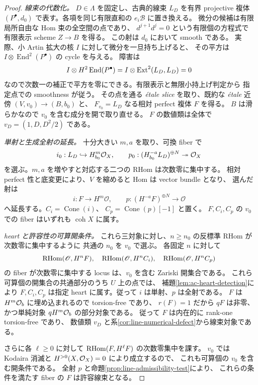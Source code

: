 \begin{proof}
\emph{線束の代数化。}
$D\in\Lambda$ を固定し、古典的線束 $L_D$ を有界 projective 複体
$(P^\bullet,d_0)$ で表す。各項を同じ有限直和の $e_i\mathscr B$ に置き換える。
微分の候補は有限局所自由な Hom 束の全空間の点であり、
$d^{j+1}d^j=0$ という有限個の方程式で有限表示 scheme $Z\to B$ を得る。
この射は $d_0$ において smooth である。
実際、小 Artin 拡大の核 $I$ に対して微分を一旦持ち上げると、
その平方は $I\otimes\operatorname{End}^2(P^\bullet)$ の cycle を与える。
障害は
\[
 I\otimes H^2\operatorname{End}(P^\bullet)
 =I\otimes\operatorname{Ext}^2(L_D,L_D)=0
\]
なので次数一の補正で平方を零にできる。有限表示と無限小持上げ判定から
指定点での smoothness が従う。
その点を通る \textit{\'etale slice}\cite[Tag 057G]{Stacks}
を取り、既約な \textit{\'etale} 近傍 $(V,v_0)\to(B,b_0)$ と、
$F_{v_0}=L_D$ なる相対 perfect 複体 $F$ を得る。
$B$ は滑らかなので $v_0$ を含む成分を開で取り直せる。
$F$ の数値類は全体で $v_D=(1,D,D^2/2)$ である。

\emph{単射と生成全射の延長。}
十分大きい $m,a$ を取り、可換 fiber で
\[
 i_0:L_D\hookrightarrow H_{b_0}^m\mathcal O_X,\qquad
 p_0:(H_{b_0}^{-a}L_D)^{\oplus N}\twoheadrightarrow\mathcal O_X
\]
を選ぶ。$m,a$ を増やすと対応する二つの RHom は次数零に集中する。
相対 perfect 性と底変更により、$V$ を縮めると Hom は vector bundle となり、
選んだ射は
\[
 i:F\longrightarrow H^m\mathscr O,\qquad
 p:(H^{-a}F)^{\oplus N}\longrightarrow\mathscr O
\]
へ延長する。$C_i=\operatorname{Cone}(i)$、
$C_p=\operatorname{Cone}(p)[-1]$ と置く。
$F,C_i,C_p$ の $v_0$ での fiber はいずれも $\operatorname{coh}X$ に属す。

\emph{heart と許容性の可算開条件。}
これら三対象に対し、$n\ge n_0$ の反標準 RHom が次数零に集中するように
共通の $n_0$ を $v_0$ で選ぶ。
各固定 $n$ に対して
\[
 \operatorname{RHom}(\mathscr O,H^nF),\quad
 \operatorname{RHom}(\mathscr O,H^nC_i),\quad
 \operatorname{RHom}(\mathscr O,H^nC_p)
\]
の fiber が次数零に集中する locus は、$v_0$ を含む Zariski 開集合である。
これら可算個の開集合の共通部分のうち $U$ 上の点では、
補題\ref{lem:ac-heart-detection}により
$F,C_i,C_p$ は指定 heart に属す。従って $i$ は単射、$p$ は全射である。
$F$ は $H^m\mathcal O_b$ に埋め込まれるので torsion-free であり、
$r(F)=1$ だから $qF$ は非零、かつ単純対象 $qH^m\mathcal O_b$ の部分対象である。
従って $F$ は内在的に rank-one torsion-free であり、
数値類 $v_D$ と系\ref{cor:line-numerical-defect}から線束対象である。

さらに各 $\ell\ge0$ に対して $\operatorname{RHom}(F,H^\ell F)$ の次数零集中を課す。
$v_0$ では Kodaira 消滅と $H^{>0}(X,\mathcal O_X)=0$ により成立するので、
これも可算個の $v_0$ を含む開条件である。
全射 $p$ と命題\ref{prop:line-admissibility-test}により、
これらの条件を満たす fiber の $F$ は許容線束となる。


\end{proof}
